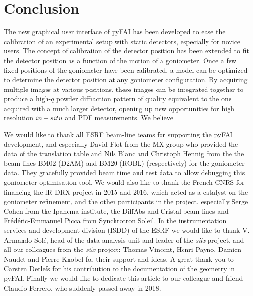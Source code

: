 \documentclass[preprint]{iucr}              %
\begin{document}
\section{Conclusion}

The new graphical user interface of pyFAI has been developed to ease the
calibration of an experimental setup with static detectors, especially for
novice users.
The concept of calibration of the detector position has been extended to fit
the detector position as a function of the motion of a goniometer.   
Once a few fixed positions of the goniometer have been calibrated, a model can
be optimized to determine the detector position at any goniometer
configuration.
By acquiring multiple images at various positions, these images can be
integrated together to produce a high-$q$ powder diffraction pattern of
quality equivalent to the one acquired with a much larger detector, opening 
up new opportunities for high resolution $in-situ$ and PDF measurements. 
We believe 
 

We would like to thank all ESRF beam-line teams for supporting the
pyFAI development, and especially David Flot from the MX-group who provided the
data of the translation table and Nils Blanc and Christoph Hennig from the the
beam-lines BM02 (D2AM) and BM20 (ROBL) (respectively) for the goniometer data. 
They gracefully provided beam time and test data to allow debugging this 
goniometer optimisation tool.
We would also like to thank the French CNRS for financing the IR-DRX project
in 2015 and 2016, which acted as a catalyst on the goniometer refinement,
and the other participants in the project, especially Serge Cohen from the
Ipanema institute, the DiffAbs and Cristal beam-lines and Frédéric-Emmanuel Picca 
from Synchrotron Soleil.
In the instrumentation services and development division (ISDD) of the ESRF  we
would like to thank V. Armando Solé, head of the data analysis unit and leader of 
the \textit{silx} project, and all our colleagues from the \textit{silx}
project:
Thomas Vincent, Henri Payno, Damien Naudet and  Pierre Knobel for their support and ideas. 
A great thank you to Carsten Detlefs for his contribution to the documentation of the geometry in pyFAI. 
Finally we would like to dedicate this article to our colleague and friend Claudio Ferrero, who suddenly passed away in 2018. 



\end{document}
